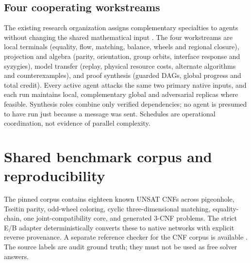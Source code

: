 \documentclass[11pt,letterpaper]{article}
\theoremstyle{definition}
\begin{document}
\subsection{Four cooperating workstreams}
The existing research organization assigns complementary specialties to agents without changing the shared mathematical input \cite{tracks,ebdirective}. The four workstreams are local terminals (equality, flow, matching, balance, wheels and regional closure), projection and algebra (parity, orientation, group orbits, interface response and syzygies), model transfer (replay, physical resource costs, alternate algorithms and counterexamples), and proof synthesis (guarded DAGs, global progress and total credit). Every active agent attacks the same two primary native inputs, and each run maintains local, complementary global and adversarial replicas where feasible. Synthesis roles combine only verified dependencies; no agent is presumed to have run just because a message was sent. Schedules are operational coordination, not evidence of parallel complexity.

\section{Shared benchmark corpus and reproducibility}\label{sec:benchmarks}
The pinned corpus \cite{corpus} contains eighteen known UNSAT CNFs across pigeonhole, Tseitin parity, odd-wheel coloring, cyclic three-dimensional matching, equality-chain, one joint-compatibility core, and generated 3-CNF problems. The strict E/B adapter \cite{compiler} deterministically converts these to native networks with explicit reverse provenance. A separate reference checker for the CNF corpus is available \cite{corpuscheck}. The source labels are audit ground truth; they must not be used as free solver answers.
\end{document}
